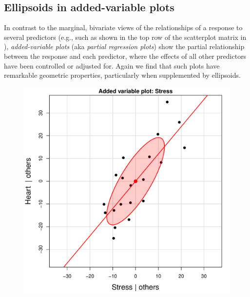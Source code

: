 \subsection{Ellipsoids in added-variable plots}\label{sec:avp}

In contrast to the marginal, bivariate views of the relationships of a response to several predictors (e.g., such as shown in the top row of the scatterplot matrix in ), \emph{added-variable plots}
(aka \emph{partial regression plots}) show the partial relationship between the response and
each predictor, where the effects of all other predictors have been controlled or adjusted for.
Again we find that such plots have remarkable geometric properties, particularly
when supplemented by ellipsoids.

\begin{figure}[htb]
 \begin{minipage}[b]{.49\linewidth}
  \centering
  \includegraphics[width=1\linewidth]{fig/coffee-avplot1}
 \end{minipage}%
 \hfill
 \begin{minipage}[b]{.49\linewidth}
  \centering

\end{minipage}
\end{figure}
